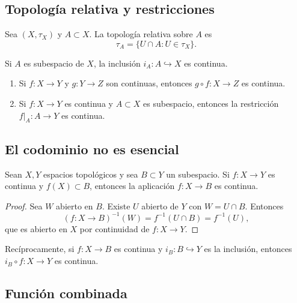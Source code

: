 \subsection{Topología relativa y restricciones}

\begin{definición}
    Sea $(X,\tau_X)$ y $A\subset X$. La topología relativa sobre $A$ es
    $$\tau_A = \{U\cap A : U\in \tau_X\}.$$
\end{definición}

\begin{lema}
    Si $A$ es subespacio de $X$, la inclusión $i_A:A\hookrightarrow X$ es continua.
\end{lema}

\begin{proposición}
    \begin{enumerate}
        \item Si $f:X\to Y$ y $g:Y\to Z$ son continuas, entonces $g\circ f:X\to Z$ es continua.
        \item Si $f:X\to Y$ es continua y $A\subset X$ es subespacio, entonces la restricción $f|_A:A\to Y$ es continua.
    \end{enumerate}
\end{proposición}


\subsection{El codominio no es esencial}

\begin{proposición}
    Sean $X, Y$ espacios topológicos y sea $B \subset Y$ un subespacio. Si $f: X \to Y$ es continua y $f(X) \subset B$, entonces la aplicación $f: X \to B$ es continua.
\end{proposición}
\begin{proof}
    Sea $W$ abierto en $B$. Existe $U$ abierto de $Y$ con $W=U\cap B$. Entonces
    $$(f: X\to B)^{-1}(W)=f^{-1}(U\cap B)=f^{-1}(U),$$
    que es abierto en $X$ por continuidad de $f: X\to Y$.
\end{proof}

\begin{observación}
    Recíprocamente, si $f: X\to B$ es continua y $i_B:B\hookrightarrow Y$ es la inclusión, entonces $i_B\circ f: X\to Y$ es continua.
\end{observación}

\subsection{Función combinada}

